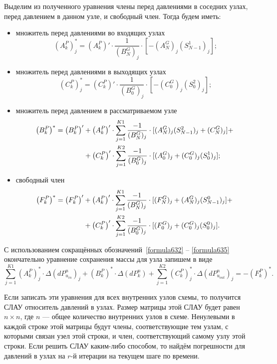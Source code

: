 Выделим из полученного уравнения члены перед давлениями в соседних узлах, перед давлением в данном узле, и свободный член. Тогда будем иметь:
\begin{itemize}[topsep=5pt, itemsep=-3pt]
\item множитель перед давлениями во входящих узлах
\begin{equation}
\label{formula632}
\left(A_k^P \right)_j^{*}=\left(A_k^P \right)' \cdot \frac{1}{(B_N^G)_j}\cdot\left[-(A_N^G)_j(S_{N-1}^1)_j\right];
\end{equation}
\item множитель перед давлениями в выходящих узлах
\begin{equation}
\label{formula633}
\left(C_k^P \right)_j^{*}=\left(C_k^P \right)' \cdot \frac{1}{(B_0^G)_j}\cdot\left[-(C_0^G)_j(S_0^2)_j\right];
\end{equation}
\item множитель перед давлением в рассматриваемом узле
\begin{align}
\label{formula634}
\left(B_k^P \right)^{*}=\left(B_k^P \right)'&+\left(A_k^P \right)'\cdot \sum_{j=1}^{K1} \frac{-1}{(B_N^G)_j}\cdot[(A_N^G)_j(S_{N-1}^2)_j+(C_N^G)_j] + \notag ~\\
&+ \left(C_k^P \right)'\cdot \sum_{j=1}^{K2} \frac{-1}{(B_0^G)_j}\cdot [(A_0^G)_j+(C_0^G)_j(S_0^1)_j];
\end{align}
\item свободный член
\begin{align}
\label{formula635}
\left(F_k^P \right)^{*}=\left(F_k^P \right)'&+\left(A_k^P \right)'\cdot \sum_{j=1}^{K1} \frac{-1}{(B_N^G)_j}\cdot[(F_N^G)_j+(A_N^G)_j(S_{N-1}^0)_j] + \notag ~\\
&+\left(C_k^P \right)'\cdot \sum_{j=1}^{K2} \frac{-1}{(B_0^G)_j}\cdot [(F_0^G)_j+(C_0^G)_j(S_0^0)_j]. 
\end{align}
\end{itemize} 

С использованием сокращённых обозначений~\eqref{formula632} -- \eqref{formula635} окончательно уравнение сохранения массы для узла запишем в виде
\begin{equation}
\label{formula636}
\sum_{j=1}^{K1}\left(A_k^P \right)_j^{*}\cdot\Delta(dP_{u_{in}}^n)_j  + \left(B_k^P \right)^{*} \cdot \Delta(dP_k^n) + \sum_{j=1}^{K2} \left(C_k^P \right)_j^{*}\cdot \Delta(dP_{u_{out}}^n)_j  = -\left(F_k^P \right)^{*}.
\end{equation}

Если записать эти уравнения для всех внутренних узлов схемы, то получится СЛАУ относитель давлений в узлах. Размер матрицы этой СЛАУ будет равен $n\times n$, где $n$ --- общее количество внутренних узлов в схеме. Ненулевыми в каждой строке этой матрицы будут члены, соответствующие тем узлам, с которыми связан узел этой строки, и член, соответствующий самому узлу этой строки. Если решить СЛАУ каким-либо способом, то найдём погрешности для давлений в узлах на $r$-й итерации на текущем шаге по времени.

